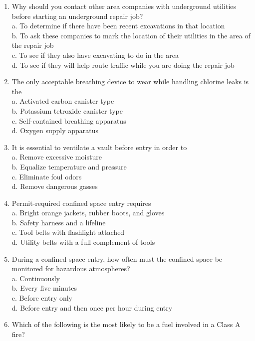 \begin{enumerate}[1.]
\item Why should you contact other area companies with underground utilities before starting an underground repair job?\\
a.	 To determine if there have been recent excavations in that location\\
b.	 To ask these companies to mark the location of their utilities in the area of the repair job\\
c.	 To see if they also have excavating to do in the area\\
d.	 To see if they will help route traffic while you are doing the repair job\\
\item The only acceptable breathing device to wear while handling chlorine leaks is the\\
a. Activated carbon canister type\\
b. Potassium tetroxide canister type\\
c. Self-contained breathing apparatus\\
d.	Oxygen supply apparatus\\
\item It is essential to ventilate a vault before entry in order to\\
a. Remove excessive moisture\\
b. Equalize temperature and pressure\\
c. Eliminate foul odors\\
d.	 Remove dangerous gasses\\
\item Permit-required confined space entry requires\\
a. Bright orange jackets, rubber boots, and gloves\\
b. Safety harness and a lifeline\\
c. Tool belts with flashlight attached\\
d. Utility belts with a full complement of tools\\
\item During a confined space entry, how often must the confined space be monitored for hazardous atmospheres?\\
a.  Continuously\\
b.  Every five minutes\\
c. Before entry only\\
d. Before entry and then once per hour during entry\\
  \item Which of the following is the most likely to be a fuel involved in a Class A fire?\\

\end{enumerate}
